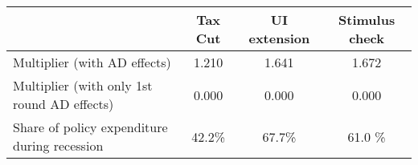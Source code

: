 \begin{tabular}{@{}lccc@{}} 
\toprule 
& Tax Cut    & UI extension    & Stimulus check    \\  \midrule 
Multiplier (with AD effects) &1.210  & 1.641  & 1.672     \\ 
Multiplier (with only 1st round AD effects) &0.000  & 0.000  & 0.000     \\ 
Share of policy expenditure during recession &42.2\%  & 67.7\%  & 61.0 \%    \\ 
\end{tabular}  
